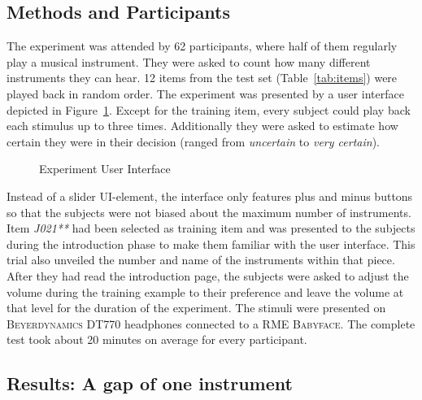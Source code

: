 \subsection{Methods and Participants}
The experiment was attended by 62 participants, where half of them regularly play a musical instrument. They were asked to count how many different instruments they can hear. 12 items from the test set (Table~\ref{tab:items}) were played back in random order. The experiment was presented by a user interface depicted in Figure~\ref{fig:experiment_ui}. Except for the training item, every subject could play back each stimulus up to three times. Additionally they were asked to estimate how certain they were in their decision (ranged from \emph{uncertain} to \emph{very certain}).
\begin{figure}[h]
	\centering
	\caption{Experiment User Interface}
	\label{fig:experiment_ui}
\end{figure}
Instead of a slider UI-element, the interface only features plus and minus buttons so that the subjects were not biased about the maximum number of instruments. Item \emph{J021**} had been selected as training item and was presented to the subjects during the introduction phase to make them familiar with the user interface. This trial also unveiled the number and name of the instruments within that piece. After they had read the introduction page, the subjects were asked to adjust the volume during the training example to their preference and leave the volume at that level for the duration of the experiment. The stimuli were presented on \textsc{Beyerdynamics DT770} headphones connected to a \textsc{RME Babyface}. The complete test took about 20 minutes on average for every participant.

\subsection{Results: A gap of one instrument}

